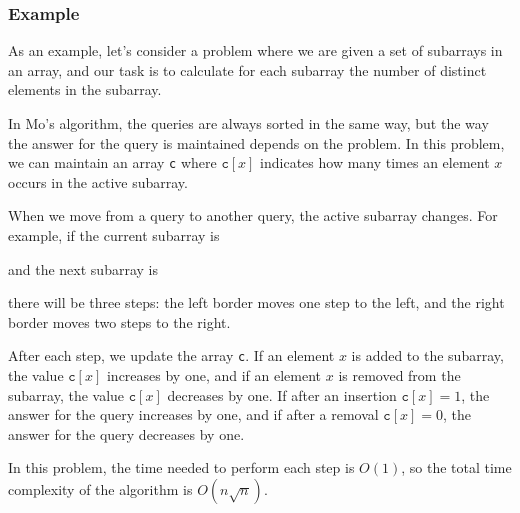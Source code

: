 \subsubsection*{Example}

As an example, let's consider a problem
where we are given a set of subarrays in an array,
and our task is to calculate for each subarray
the number of distinct elements in the subarray.

In Mo's algorithm, the queries are always sorted
in the same way, but the way the answer for the query
is maintained depends on the problem.
In this problem, we can maintain an array 
\texttt{c} where $\texttt{c}[x]$
indicates how many times an element $x$
occurs in the active subarray.

When we move from a query to another query,
the active subarray changes.
For example, if the current subarray is
\begin{center}
\end{center}
and the next subarray is
\begin{center}
\end{center}
there will be three steps:
the left border moves one step to the left,
and the right border moves two steps to the right.

After each step, we update the
array \texttt{c}.
If an element $x$ is added to the subarray,
the value
$\texttt{c}[x]$ increases by one,
and if an element $x$ is removed from the subarray,
the value $\texttt{c}[x]$ decreases by one.
If after an insertion
$\texttt{c}[x]=1$,
the answer for the query increases by one,
and if after a removal $\texttt{c}[x]=0$,
the answer for the query decreases by one.

In this problem, the time needed to perform
each step is $O(1)$, so the total time complexity
of the algorithm is $O(n \sqrt n)$.
